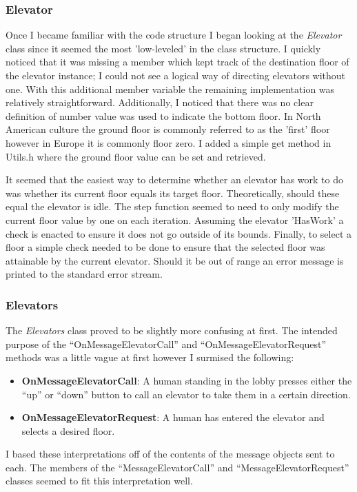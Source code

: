 \documentclass{article}
\begin{document}
\subsubsection{Elevator}
Once I became familiar with the code structure I began looking at the \textit{Elevator} class since it seemed the most 'low-leveled' in the class structure.
I quickly noticed that it was missing a member which kept track of the destination floor of the elevator instance; I could not see a logical way of directing elevators without one.
With this additional member variable the remaining implementation was relatively straightforward.
Additionally, I noticed that there was no clear definition of number value was used to indicate the bottom floor.
In North American culture the ground floor is commonly referred to as the 'first' floor however in Europe it is commonly floor zero.
I added a simple get method in Utils.h where the ground floor value can be set and retrieved.\newline

It seemed that the easiest way to determine whether an elevator has work to do was whether its current floor equals its target floor.
Theoretically, should these equal the elevator is idle.
The step function seemed to need to only modify the current floor value by one on each iteration.
Assuming the elevator 'HasWork' a check is enacted to ensure it does not go outside of its bounds.
Finally, to select a floor a simple check needed to be done to ensure that the selected floor was attainable by the current elevator. 
Should it be out of range an error message is printed to the standard error stream.


\subsubsection{Elevators}
The \textit{Elevators} class proved to be slightly more confusing at first.
The intended purpose of the ``OnMessageElevatorCall'' and ``OnMessageElevatorRequest'' methods was a little vague at first however I surmised the following:
\begin{itemize}
	\item \textbf{OnMessageElevatorCall}: A human standing in the lobby presses either the ``up'' or ``down'' button to call an elevator to take them in a certain direction.
	\item \textbf{OnMessageElevatorRequest}: A human has entered the elevator and selects a desired floor.
\end{itemize}
I based these interpretations off of the contents of the message objects sent to each. 
The members of the ``MessageElevatorCall'' and ``MessageElevatorRequest'' classes seemed to fit this interpretation well.\newline
\end{document}
